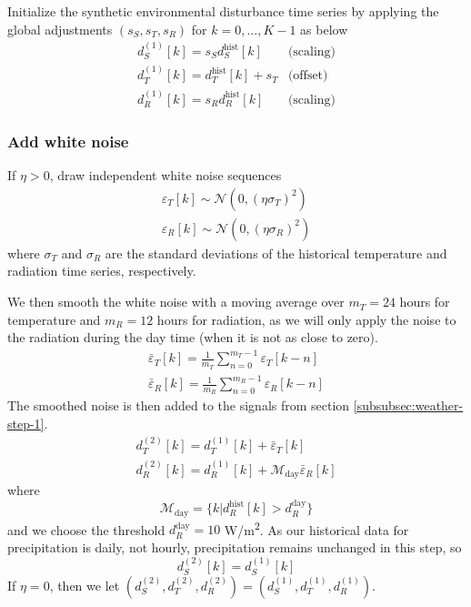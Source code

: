 \documentclass[pdflatex,sn-mathphys-num]{sn-jnl}
\newcommand{\df}[2]{\displaystyle\frac{#1}{#2}}
\begin{document}
Initialize the synthetic environmental disturbance time series by applying the global adjustments $(s_{S}, s_{T}, s_{R})$ for $k=0,...,K-1$ as below
\begin{equation}
\begin{array}{ll}
d_{S}^{(1)}[k] = s_{S}d_{S}^{\text{hist}}[k]    & \text{(scaling)} \\[7pt]
d_{T}^{(1)}[k] = d_{T}^{\text{hist}}[k] + s_{T} & \text{(offset)}  \\[7pt]
d_{R}^{(1)}[k] = s_{R}d_{R}^{\text{hist}}[k]    & \text{(scaling)}
\end{array}
\label{eqn:global-scaling}
\end{equation}

\subsubsection{Add white noise}\label{subsubsec:weather-step-2}

If $\eta > 0$, draw independent white noise sequences
\begin{align}
\varepsilon_{T}[k] \sim \mathcal{N}(0, (\eta\sigma_{T})^{2}) \\
\varepsilon_{R}[k] \sim \mathcal{N}(0, (\eta\sigma_{R})^{2})
\label{eqn:varepsilon}
\end{align}
where $\sigma_{T}$ and $\sigma_{R}$ are the standard deviations of the historical temperature and radiation time series, respectively.

We then smooth the white noise with a moving average over $m_{T} = 24$ hours for temperature and $m_{R} = 12$ hours for radiation, as we will only apply the noise to the radiation during the day time (when it is not as close to zero).
\begin{align}
\bar{\varepsilon}_{T}[k] = \df{1}{m_{T}} \sum_{n=0}^{m_{T} - 1} \varepsilon_{T}[k-n] \\
\bar{\varepsilon}_{R}[k] = \df{1}{m_{R}} \sum_{n=0}^{m_{R} - 1} \varepsilon_{R}[k-n]
\label{eqn:smooth-noise}
\end{align}
The smoothed noise is then added to the signals from section \ref{subsubsec:weather-step-1}.
\begin{align}
d_{T}^{(2)}[k] = d_{T}^{(1)}[k] + \bar{\varepsilon}_{T}[k] \\
d_{R}^{(2)}[k] = d_{R}^{(1)}[k] + \mathcal{M}_{\text{day}}\bar{\varepsilon}_{R}[k]
\label{eqn:add-noise}
\end{align}
where
\begin{equation}
\mathcal{M}_{\text{day}} = \{ k | d_{R}^{\text{hist}}[k] > d_{R}^{\text{day}} \}
\label{eqn:daymask}
\end{equation}
and we choose the threshold $d_{R}^{\text{day}} = 10$ W/m\textsuperscript{2}. As our historical data for precipitation is daily, not hourly, precipitation remains unchanged in this step, so
\begin{equation}
d_{S}^{(2)}[k] = d_{S}^{(1)}[k]
\label{eqn:P2-P1}
\end{equation}
If $\eta = 0$, then we let $(d_{S}^{(2)}, d_{T}^{(2)}, d_{R}^{(2)}) = (d_{S}^{(1)}, d_{T}^{(1)}, d_{R}^{(1)})$.
\end{document}
